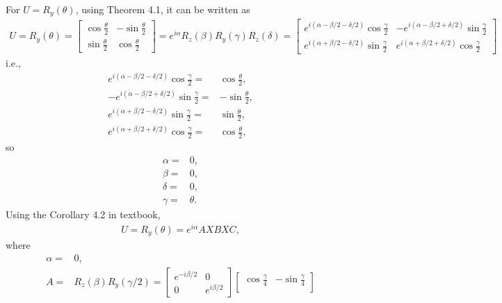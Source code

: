 \documentclass[en]{sol-man}
\begin{document}
\begin{sol}
    For $U=R_y(\theta)$, using Theorem 4.1, it can be written as
    \begin{align}
        U=R_y(\theta)=\begin{bmatrix}
            \cos\frac{\theta}{2}&-\sin\frac{\theta}{2}\\
            \sin\frac{\theta}{2}&\cos\frac{\theta}{2}
        \end{bmatrix}=e^{i\alpha}R_z(\beta)R_y(\gamma)R_z(\delta)=\begin{bmatrix}
            e^{i(\alpha-\beta/2-\delta/2)}\cos\frac{\gamma}{2}&-e^{i(\alpha-\beta/2+\delta/2)}\sin\frac{\gamma}{2}\\
            e^{i(\alpha+\beta/2-\delta/2)}\sin\frac{\gamma}{2}&e^{i(\alpha+\beta/2+\delta/2)}\cos\frac{\gamma}{2}
        \end{bmatrix}
    \end{align}
    i.e.,
    \begin{align}
        e^{i(\alpha-\beta/2-\delta/2)}\cos\frac{\gamma}{2}=&\cos\frac{\theta}{2},\\
        -e^{i(\alpha-\beta/2+\delta/2)}\sin\frac{\gamma}{2}=&-\sin\frac{\theta}{2},\\
        e^{i(\alpha+\beta/2-\delta/2)}\sin\frac{\gamma}{2}=&\sin\frac{\theta}{2},\\
        e^{i(\alpha+\beta/2+\delta/2)}\cos\frac{\gamma}{2}=&\cos\frac{\theta}{2},
    \end{align}
    so
    \begin{align}
        \alpha=&0,\\
        \beta=&0,\\
        \delta=&0,\\
        \gamma=&\theta.
    \end{align}
    Using the Corollary 4.2 in textbook,
    \begin{align}
        U=R_y(\theta)=e^{i\alpha}AXBXC,
    \end{align}
    where
    \begin{align}
        \alpha=&0,\\
        A=&R_z(\beta)R_y(\gamma/2)=\begin{bmatrix}
            e^{-i\beta/2}&0\\
            0&e^{i\beta/2}
        \end{bmatrix}\begin{bmatrix}
            \cos\frac{\gamma}{4}&-\sin\frac{\gamma}{4}\\

\end{bmatrix}
\end{align}
\end{sol}
\end{document}
